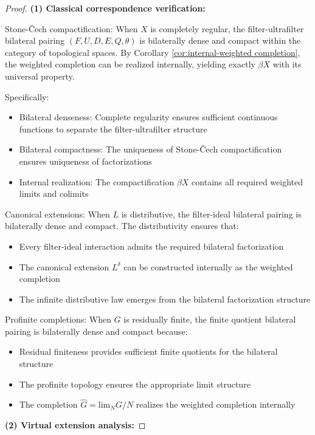 \documentclass[11pt]{article}
\theoremstyle{plain}
\theoremstyle{definition}
\theoremstyle{remark}
\renewcommand{\lim}{\mathrm{lim}}
\newcommand{\wh}[1]{\widehat{#1}}
\begin{document}
\begin{proof}
\textbf{(1) Classical correspondence verification:}

Stone-\v{C}ech compactification: When $X$ is completely regular, the filter-ultrafilter bilateral pairing $(F, U, D, E, Q, \theta)$ is bilaterally dense and compact within the category of topological spaces. By Corollary \ref{cor:internal-weighted completion}, the weighted completion can be realized internally, yielding exactly $\beta X$ with its universal property.

Specifically:
\begin{itemize}
\item Bilateral denseness: Complete regularity ensures sufficient continuous functions to separate the filter-ultrafilter structure
\item Bilateral compactness: The uniqueness of Stone-\v{C}ech compactification ensures uniqueness of factorizations
\item Internal realization: The compactification $\beta X$ contains all required weighted limits and colimits
\end{itemize}

Canonical extensions: When $L$ is distributive, the filter-ideal bilateral pairing is bilaterally dense and compact. The distributivity ensures that:
\begin{itemize}
\item Every filter-ideal interaction admits the required bilateral factorization
\item The canonical extension $L^{\delta}$ can be constructed internally as the weighted completion
\item The infinite distributive law emerges from the bilateral factorization structure
\end{itemize}

Profinite completions: When $G$ is residually finite, the finite quotient bilateral pairing is bilaterally dense and compact because:
\begin{itemize}
\item Residual finiteness provides sufficient finite quotients for the bilateral structure
\item The profinite topology ensures the appropriate limit structure
\item The completion $\wh{G} = \lim_{N} G/N$ realizes the weighted completion internally
\end{itemize}

\textbf{(2) Virtual extension analysis:}


\end{proof}
\end{document}
